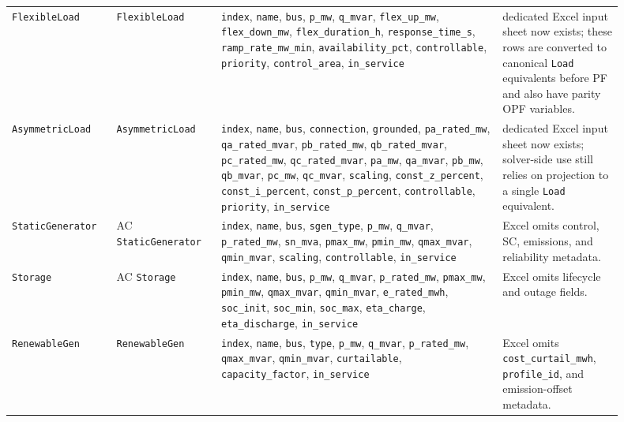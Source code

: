 \begin{longtable}{L{0.15\linewidth}L{0.15\linewidth}L{0.42\linewidth}L{0.18\linewidth}}
\texttt{FlexibleLoad} & \texttt{FlexibleLoad} & \texttt{index}, \texttt{name}, \texttt{bus}, \texttt{p\_mw}, \texttt{q\_mvar}, \texttt{flex\_up\_mw}, \texttt{flex\_down\_mw}, \texttt{flex\_duration\_h}, \texttt{response\_time\_s}, \texttt{ramp\_rate\_mw\_min}, \texttt{availability\_pct}, \texttt{controllable}, \texttt{priority}, \texttt{control\_area}, \texttt{in\_service} & dedicated Excel input sheet now exists; these rows are converted to canonical \texttt{Load} equivalents before PF and also have parity OPF variables. \\
\texttt{AsymmetricLoad} & \texttt{AsymmetricLoad} & \texttt{index}, \texttt{name}, \texttt{bus}, \texttt{connection}, \texttt{grounded}, \texttt{pa\_rated\_mw}, \texttt{qa\_rated\_mvar}, \texttt{pb\_rated\_mw}, \texttt{qb\_rated\_mvar}, \texttt{pc\_rated\_mw}, \texttt{qc\_rated\_mvar}, \texttt{pa\_mw}, \texttt{qa\_mvar}, \texttt{pb\_mw}, \texttt{qb\_mvar}, \texttt{pc\_mw}, \texttt{qc\_mvar}, \texttt{scaling}, \texttt{const\_z\_percent}, \texttt{const\_i\_percent}, \texttt{const\_p\_percent}, \texttt{controllable}, \texttt{priority}, \texttt{in\_service} & dedicated Excel input sheet now exists; solver-side use still relies on projection to a single \texttt{Load} equivalent. \\
\texttt{StaticGenerator} & AC \texttt{StaticGenerator} & \texttt{index}, \texttt{name}, \texttt{bus}, \texttt{sgen\_type}, \texttt{p\_mw}, \texttt{q\_mvar}, \texttt{p\_rated\_mw}, \texttt{sn\_mva}, \texttt{pmax\_mw}, \texttt{pmin\_mw}, \texttt{qmax\_mvar}, \texttt{qmin\_mvar}, \texttt{scaling}, \texttt{controllable}, \texttt{in\_service} & Excel omits control, SC, emissions, and reliability metadata. \\
\texttt{Storage} & AC \texttt{Storage} & \texttt{index}, \texttt{name}, \texttt{bus}, \texttt{p\_mw}, \texttt{q\_mvar}, \texttt{p\_rated\_mw}, \texttt{pmax\_mw}, \texttt{pmin\_mw}, \texttt{qmax\_mvar}, \texttt{qmin\_mvar}, \texttt{e\_rated\_mwh}, \texttt{soc\_init}, \texttt{soc\_min}, \texttt{soc\_max}, \texttt{eta\_charge}, \texttt{eta\_discharge}, \texttt{in\_service} & Excel omits lifecycle and outage fields. \\
\texttt{RenewableGen} & \texttt{RenewableGen} & \texttt{index}, \texttt{name}, \texttt{bus}, \texttt{type}, \texttt{p\_mw}, \texttt{q\_mvar}, \texttt{p\_rated\_mw}, \texttt{qmax\_mvar}, \texttt{qmin\_mvar}, \texttt{curtailable}, \texttt{capacity\_factor}, \texttt{in\_service} & Excel omits \texttt{cost\_curtail\_mwh}, \texttt{profile\_id}, and emission-offset metadata. \\

\end{longtable}
